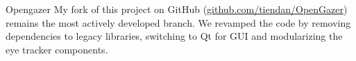

\begin{cvopensource}

  \cvproject
    {Opengazer} %
    {
        My fork of this project on GitHub (\href{http://www.github.com/tiendan/OpenGazer}{github.com/tiendan/OpenGazer}) remains the most actively developed branch. We revamped the code by removing dependencies to legacy libraries, switching to Qt for GUI and modularizing the eye tracker components.
    }
\end{cvopensource}
